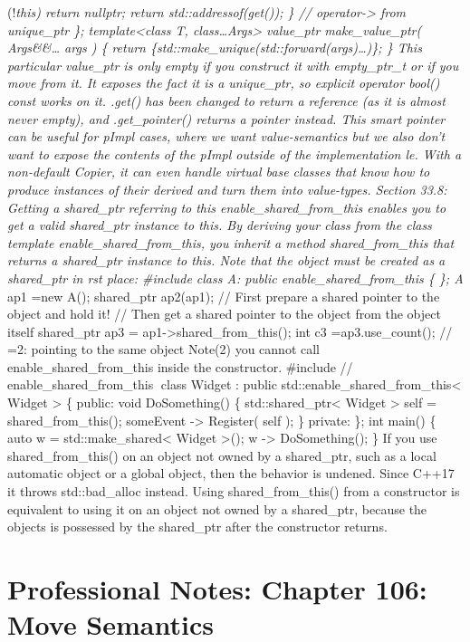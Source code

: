 (!\emph{this) return nullptr; return std::addressof(get()); \} //
operator-\textgreater{} from unique\_ptr \}; template\textless class T,
class\ldots Args\textgreater{} value\_ptr make\_value\_ptr(
Args\&\&\ldots{} args ) \{ return
\{std::make\_unique(std::forward(args)\ldots)\}; \} This particular
value\_ptr is only empty if you construct it with empty\_ptr\_t or if
you move from it. It exposes the fact it is a unique\_ptr, so explicit
operator bool() const works on it. .get() has been changed to return a
reference (as it is almost never empty), and .get\_pointer() returns a
pointer instead. This smart pointer can be useful for pImpl cases, where
we want value-semantics but we also don't want to expose the contents of
the pImpl outside of the implementation le. With a non-default Copier,
it can even handle virtual base classes that know how to produce
instances of their derived and turn them into value-types. Section 33.8:
Getting a shared\_ptr referring to this enable\_shared\_from\_this
enables you to get a valid shared\_ptr instance to this. By deriving
your class from the class template enable\_shared\_from\_this, you
inherit a method shared\_from\_this that returns a shared\_ptr instance
to this. Note that the object must be created as a shared\_ptr in rst
place: \#include class A: public enable\_shared\_from\_this \{ \}; A}
ap1 =new A(); shared\_ptr ap2(ap1); // First prepare a shared pointer to
the object and hold it! // Then get a shared pointer to the object from
the object itself shared\_ptr ap3 =
ap1-\textgreater shared\_from\_this(); int c3 =ap3.use\_count(); // =2:
pointing to the same object Note(2) you cannot call
enable\_shared\_from\_this inside the constructor. \#include //
enable\_shared\_from\_this class Widget : public
std::enable\_shared\_from\_this\textless{} Widget \textgreater{} \{
public: void DoSomething() \{ std::shared\_ptr\textless{} Widget
\textgreater{} self = shared\_from\_this(); someEvent -\textgreater{}
Register( self ); \} private: \}; int main() \{ auto w =
std::make\_shared\textless{} Widget \textgreater(); w -\textgreater{}
DoSomething(); \} If you use shared\_from\_this() on an object not owned
by a shared\_ptr, such as a local automatic object or a global object,
then the behavior is undened. Since C++17 it throws std::bad\_alloc
instead. Using shared\_from\_this() from a constructor is equivalent to
using it on an object not owned by a shared\_ptr, because the objects is
possessed by the shared\_ptr after the constructor returns.

\hypertarget{professional-notes-chapter-106-move-semantics-1}{%
\section{Professional Notes: Chapter 106: Move
Semantics}\label{professional-notes-chapter-106-move-semantics-1}}

